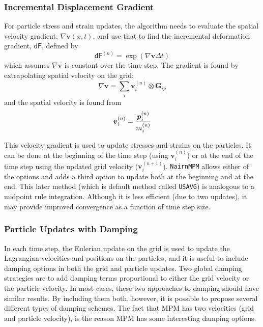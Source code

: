 \documentclass[11pt]{article}
\renewcommand{\vec}[1]{\boldsymbol{#1}}
\newcommand{\tens}[1]{\boldsymbol{\mathsf{#1}}}
\begin{document}
\subsubsection{Incremental Displacement Gradient}

For particle stress and strain updates, the algorithm needs to evaluate the spatial velocity gradient, $\nabla \vec v(x,t)$, and use that to find the incremental deformation gradient, $\tens{dF}$, defined by
\begin{equation}
     \tens{dF}^{(n)} = \exp(\nabla \vec v \Delta t)
\end{equation}
which assumes $\nabla \vec v$ is constant over the time step. The gradient is found by extrapolating spatial velocity on the grid:
\begin{equation}
    \nabla \vec v = \sum_i \vec v_i^{(n)} \otimes \vec G_{ip}
\end{equation}
and the spatial velocity is found from
\begin{equation}
      \vec  v_i^{(n)} = {\vec p_i^{(n)}\over m_i^{(n)}} 
\end{equation}

This velocity gradient is used to update stresses and strains on the particles. It can be done at the beginning of the time step (using $\vec  v_i^{(n)}$) or at the end of the time step using the updated grid velocity ($\vec  v_i^{(n+1)}$). {\tt NairnMPM} allows either of the options and adds a third option to update both at the beginning and at the end. This later method (which is default method called {\tt USAVG}) is analogous to a midpoint rule integration. Although it is less efficient (due to two updates), it may provide improved convergence as a function of time step size.

\subsubsection{Particle Updates with Damping}

In each time step, the Eulerian update on the grid is used to update the Lagrangian velocities and positions on the particles, and it is useful to include damping options in both the grid and particle updates. Two global damping strategies are to add damping terms proportional to either the grid velocity or the particle velocity. In most cases, these two approaches to damping should have similar results. By including them both, however, it is possible to propose several different types of damping schemes. The fact that MPM has two velocities (grid and particle velocity), is the reason MPM has some interesting damping options.
\end{document}
